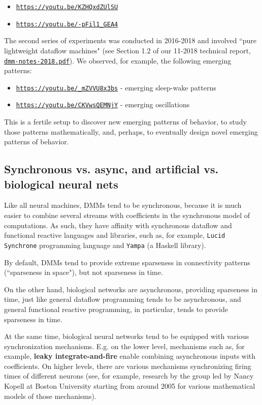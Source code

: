 \documentclass{article}
\begin{document}
\begin{itemize}
   \item \href{https://youtu.be/KZHQxdZUlSU}{\tt https://youtu.be/KZHQxdZUlSU}
   \item \href{https://youtu.be/-pFil1\_GEA4}{\tt https://youtu.be/-pFil1\_GEA4}
\end{itemize}

The second series of experiments was conducted in 2016-2018 and involved ``pure lightweight dataflow machines" (see Section 1.2 of our 11-2018 technical report, 
\href{https://www.cs.brandeis.edu/~bukatin/dmm-notes-2018.pdf}{\tt dmm-notes-2018.pdf}).
We observed, for example, the following emerging patterns:

\begin{itemize}
   \item \href{https://youtu.be/\_mZVVU8x3bs}{\tt https://youtu.be/\_mZVVU8x3bs} - emerging sleep-wake patterns
   \item \href{https://youtu.be/CKVwsQEMNjY}{\tt https://youtu.be/CKVwsQEMNjY} - emerging oscillations
\end{itemize}

This is a fertile setup to discover new emerging patterns of behavior, to study those patterns mathematically,
and, perhaps, to eventually design novel emerging patterns of behavior.

\subsection{Synchronous vs. async, and artificial vs. biological neural nets}

Like all neural machines, DMMs tend to be synchronous, because it is much easier to combine
several streams with coefficients in the synchronous model of computations. As such, they have affinity with
synchronous dataflow and functional reactive languages and libraries, such as, for example,
{\tt Lucid Synchrone} programming language and {\tt Yampa} (a Haskell library).

By default, DMMs tend to provide extreme sparseness in connectivity patterns (``sparseness in space"),
but not sparseness in time. 

On the other hand, biological networks are asynchronous, providing sparseness in time, just like
general dataflow programming tends to be asynchronous, and general functional reactive programming,
in particular, tends to provide sparseness in time.

At the same time, biological neural networks tend to be equipped with various synchronization mechanisms.
E.g. on the lower level, mechanisms such as, for example, {\bf leaky integrate-and-fire} enable combining
asynchronous inputs with coefficients. On higher levels, there are various mechanisms synchronizing firing times
of different neurons (see, for example, research by the group led by Nancy Kopell at Boston University starting from
around 2005 for various mathematical models of those mechanisms).
\end{document}
